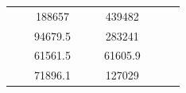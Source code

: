 \begin{table}[]
\begin{tabular}{|cccccclll}
\multicolumn{1}{|c|}{\cellcolor[HTML]{FFFFC7}}                                & \multicolumn{1}{c|}{\cellcolor[HTML]{DDFDFF}}                      & \multicolumn{1}{c|}{\cellcolor[HTML]{DAE8FC}188657}    & \multicolumn{1}{c|}{\cellcolor[HTML]{FFFFC7}}                                & \multicolumn{1}{c|}{\cellcolor[HTML]{DDFDFF}}                       & \multicolumn{1}{c|}{\cellcolor[HTML]{DDFDFF}439482}    &                                                                              &                                                                    &                                                        \\ \cline{3-3} \cline{6-6}
\multicolumn{1}{|c|}{\cellcolor[HTML]{FFFFC7}}                                & \multicolumn{1}{c|}{\cellcolor[HTML]{DDFDFF}}                      & \multicolumn{1}{c|}{\cellcolor[HTML]{DDFDFF}94679.5}   & \multicolumn{1}{c|}{\cellcolor[HTML]{FFFFC7}}                                & \multicolumn{1}{c|}{\cellcolor[HTML]{DDFDFF}}                       & \multicolumn{1}{c|}{\cellcolor[HTML]{DAE8FC}283241}    &                                                                              &                                                                    &                                                        \\ \cline{3-3} \cline{6-6}
\multicolumn{1}{|c|}{\cellcolor[HTML]{FFFFC7}}                                & \multicolumn{1}{c|}{\cellcolor[HTML]{DDFDFF}}                      & \multicolumn{1}{c|}{\cellcolor[HTML]{DAE8FC}61561.5}   & \multicolumn{1}{c|}{\cellcolor[HTML]{FFFFC7}}                                & \multicolumn{1}{c|}{\cellcolor[HTML]{DDFDFF}}                       & \multicolumn{1}{c|}{\cellcolor[HTML]{DDFDFF}61605.9}   &                                                                              &                                                                    &                                                        \\ \cline{3-3} \cline{6-6}
\multicolumn{1}{|c|}{\cellcolor[HTML]{FFFFC7}}                                & \multicolumn{1}{c|}{\cellcolor[HTML]{DDFDFF}}                      & \multicolumn{1}{c|}{\cellcolor[HTML]{DDFDFF}71896.1}   & \multicolumn{1}{c|}{\cellcolor[HTML]{FFFFC7}}                                & \multicolumn{1}{c|}{\cellcolor[HTML]{DDFDFF}}                       & \multicolumn{1}{c|}{\cellcolor[HTML]{DAE8FC}127029}    &                                                                              &                                                                    &                                                        \\ \cline{3-3} \cline{6-6}

\end{tabular}
\end{table}
